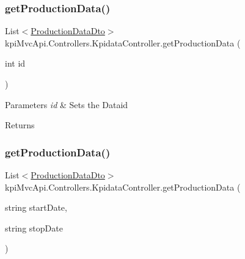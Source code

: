 \subsubsection{\texorpdfstring{get\+Production\+Data()}{getProductionData()}\hspace{0.1cm}{\footnotesize\ttfamily [2/3]}}
{\footnotesize\ttfamily List$<$\hyperlink{classkpi_mvc_api_1_1_data_transfer_objects_1_1_production_data_dto}{Production\+Data\+Dto}$>$ kpi\+Mvc\+Api.\+Controllers.\+Kpidata\+Controller.\+get\+Production\+Data (\begin{DoxyParamCaption}\item[{int}]{id }\end{DoxyParamCaption})\hspace{0.3cm}{\ttfamily [inline]}}






\begin{DoxyParams}{Parameters}
{\em id} & Sets the Dataid\\
\hline
\end{DoxyParams}
\begin{DoxyReturn}{Returns}

\end{DoxyReturn}
\mbox{\label{classkpi_mvc_api_1_1_controllers_1_1_kpidata_controller_a27722d65abe0781d4b670c84c2e07a76}} 
\subsubsection{\texorpdfstring{get\+Production\+Data()}{getProductionData()}\hspace{0.1cm}{\footnotesize\ttfamily [3/3]}}
{\footnotesize\ttfamily List$<$\hyperlink{classkpi_mvc_api_1_1_data_transfer_objects_1_1_production_data_dto}{Production\+Data\+Dto}$>$ kpi\+Mvc\+Api.\+Controllers.\+Kpidata\+Controller.\+get\+Production\+Data (\begin{DoxyParamCaption}\item[{string}]{start\+Date,  }\item[{string}]{stop\+Date }\end{DoxyParamCaption})\hspace{0.3cm}{\ttfamily [inline]}}






